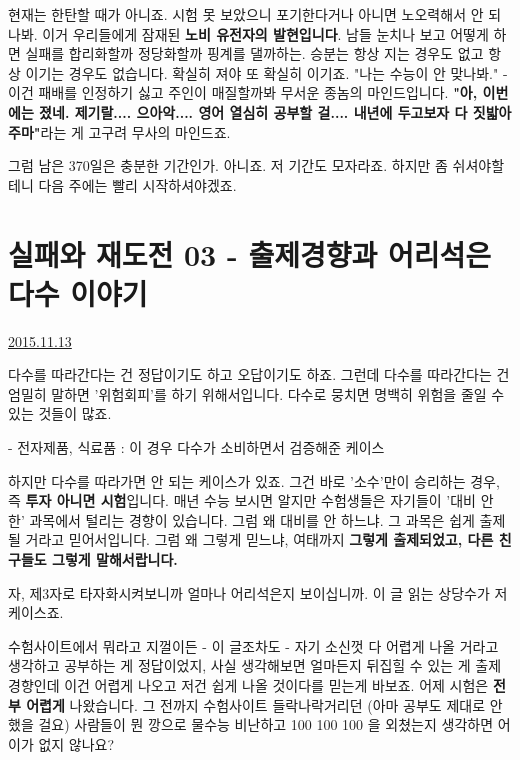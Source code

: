 현재는 한탄할 때가 아니죠.
시험 못 보았으니 포기한다거나 아니면 노오력해서 안 되나봐.
이거 우리들에게 잠재된 \textbf{노비 유전자의 발현입니다}.
남들 눈치나 보고 어떻게 하면 실패를 합리화할까 정당화할까 핑계를 댈까하는.
승분는 항상 지는 경우도 없고 항상 이기는 경우도 없습니다. 확실히 져야 또 확실히 이기죠.
"나는 수능이 안 맞나봐." - 이건 패배를 인정하기 싫고 주인이 매질할까봐 무서운 종놈의 마인드입니다.
\textbf{"아, 이번에는 졌네. 제기랄.... 으아악.... 영어 열심히 공부할 걸.... 내년에 두고보자 다 짓밟아주마"}라는 게 고구려 무사의 마인드죠.
\vspace{5mm}

그럼 남은 370일은 충분한 기간인가.
아니죠. 저 기간도 모자라죠. 하지만 좀 쉬셔야할 테니 다음 주에는 빨리 시작하셔야겠죠.
\vspace{5mm}






\section{실패와 재도전 03 - 출제경향과 어리석은 다수 이야기}
\href{https://www.kockoc.com/Apoc/481696}{2015.11.13}

\vspace{5mm}

다수를 따라간다는 건 정답이기도 하고 오답이기도 하죠.
그런데 다수를 따라간다는 건 엄밀히 말하면 '위험회피'를 하기 위해서입니다.
다수로 뭉치면 명백히 위험을 줄일 수 있는 것들이 많죠.
\vspace{5mm}

- 전자제품, 식료품 : 이 경우 다수가 소비하면서 검증해준 케이스
\vspace{5mm}

하지만 다수를 따라가면 안 되는 케이스가 있죠. 그건 바로 '소수'만이 승리하는 경우, 즉 \textbf{투자 아니면 시험}입니다.
매년 수능 보시면 알지만 수험생들은 자기들이 '대비 안 한' 과목에서 털리는 경향이 있습니다.
그럼 왜 대비를 안 하느냐. 그 과목은 쉽게 출제될 거라고 믿어서입니다.
그럼 왜 그렇게 믿느냐, 여태까지 \textbf{그렇게 출제되었고, 다른 친구들도 그렇게 말해서랍니다.}
\vspace{5mm}

자, 제3자로 타자화시켜보니까 얼마나 어리석은지 보이십니까.
이 글 읽는 상당수가 저 케이스죠.
\vspace{5mm}

수험사이트에서 뭐라고 지껄이든 - 이 글조차도 - 자기 소신껏 다 어렵게 나올 거라고 생각하고 공부하는 게 정답이었지,
사실 생각해보면 얼마든지 뒤집힐 수 있는 게 출제 경향인데 이건 어렵게 나오고 저건 쉽게 나올 것이다를 믿는게 바보죠.
어제 시험은 \textbf{전부 어렵게} 나왔습니다.
그 전까지 수험사이트 들락나락거리던 (아마 공부도 제대로 안 했을 걸요) 사람들이
뭔 깡으로 물수능 비난하고 100 100 100 을 외쳤는지 생각하면 어이가 없지 않나요?
\vspace{5mm}

